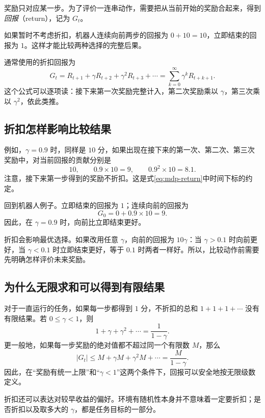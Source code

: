\documentclass[UTF8,12pt,a4paper,fontset=fandol]{ctexart}
\begin{document}
奖励只对应某一步。为了评价一连串动作，需要把从当前开始的奖励合起来，得到\emph{回报}（return），记为 $G_t$。

如果暂时不考虑折扣，机器人连续向前两步的回报为 $0+10=10$，立即结束的回报为 $1$。这样才能比较两种选择的完整后果。

通常使用的折扣回报为
\begin{equation}
  G_t=R_{t+1}+\gamma R_{t+2}+\gamma^2R_{t+3}+\cdots
     =\sum_{k=0}^{\infty}\gamma^kR_{t+k+1}.
  \label{eq:mdp-return}
\end{equation}
这个公式可以逐项读：接下来第一次奖励完整计入，第二次奖励乘以 $\gamma$，第三次乘以 $\gamma^2$，依此类推。

\subsection{折扣怎样影响比较结果}

例如，$\gamma=0.9$ 时，同样是 $10$ 分，如果出现在接下来的第一次、第二次、第三次奖励中，对当前回报的贡献分别是
\[
  10,\qquad 0.9\times10=9,\qquad 0.9^2\times10=8.1.
\]
注意，接下来第一步得到的奖励不折扣。这是式\eqref{eq:mdp-return}中时间下标的约定。

回到机器人例子。立即结束的回报为 $1$；连续向前的回报为
\begin{equation}
  G_0=0+0.9\times10=9.
  \label{eq:mdp-example-return}
\end{equation}
因此，在 $\gamma=0.9$ 时，向前比立即结束更好。

折扣会影响最优选择。如果改用任意 $\gamma$，向前的回报为 $10\gamma$：当 $\gamma>0.1$ 时向前更好，当 $\gamma<0.1$ 时立即结束更好，等于 $0.1$ 时两者一样好。所以，比较动作前需要先明确怎样评价未来奖励。

\subsection{为什么无限求和可以得到有限结果}

对于一直运行的任务，如果每一步都得到 $1$ 分，不折扣的总和 $1+1+1+\cdots$ 没有有限结果。若 $0\leq\gamma<1$，则
\[
  1+\gamma+\gamma^2+\cdots=\frac{1}{1-\gamma}.
\]
更一般地，如果每一步奖励的绝对值都不超过同一个有限数 $M$，那么
\begin{equation}
  |G_t|\leq M+\gamma M+\gamma^2M+\cdots
           =\frac{M}{1-\gamma}.
  \label{eq:mdp-return-bound}
\end{equation}
因此，在“奖励有统一上限”和“$\gamma<1$”这两个条件下，回报可以安全地按无限级数定义。

折扣还可以表达对较早收益的偏好。环境有随机性本身并不意味着一定要折扣；是否折扣以及取多大的 $\gamma$，都是任务目标的一部分。
\end{document}

